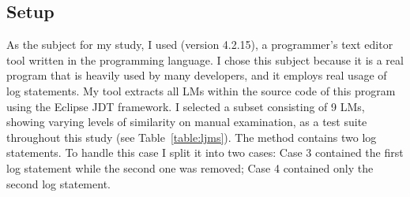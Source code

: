 


\subsection{Setup}  \label{study1_setup}

As the subject for my study, I used  (version 4.2.15), a programmer's text editor tool written in the  programming language. I chose this subject because it is a real program that is heavily used by many developers, and it employs real usage of log statements. My tool extracts all LMs within the source code of this program using the Eclipse JDT framework. I selected a subset consisting of 9 LMs, showing varying levels of similarity on manual examination, as a test suite throughout this study (see Table~\ref{table:ljms}).
The  method contains two log statements. To handle this case I split it into two cases: Case 3 contained the first log statement while the second one was removed; Case 4 contained only the second log statement.

